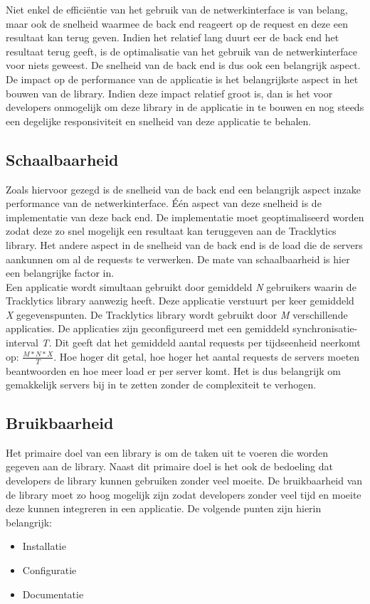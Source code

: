 \noindent Niet enkel de effici\"entie van het gebruik van de netwerkinterface is van belang, maar ook de snelheid waarmee de back end reageert op de request en deze een resultaat kan terug geven. Indien het relatief lang duurt eer de back end het resultaat terug geeft, is de optimalisatie van het gebruik van de netwerkinterface voor niets geweest. De snelheid van de back end is dus ook een belangrijk aspect. \\

\noindent De impact op de performance van de applicatie is het belangrijkste aspect in het bouwen van de library. Indien deze impact relatief groot is, dan is het voor developers onmogelijk om deze library in de applicatie in te bouwen en nog steeds een degelijke responsiviteit en snelheid van deze applicatie te behalen. 

\subsection{Schaalbaarheid}
Zoals hiervoor gezegd is de snelheid van de back end een belangrijk aspect inzake performance van de netwerkinterface. \'E\'en aspect van deze snelheid is de implementatie van deze back end. De implementatie moet geoptimaliseerd worden zodat deze zo snel mogelijk een resultaat kan teruggeven aan de Tracklytics library. Het andere aspect in de snelheid van de back end is de load die de servers aankunnen om al de requests te verwerken. De mate van schaalbaarheid is hier een belangrijke factor in. \\

\noindent Een applicatie wordt simultaan gebruikt door gemiddeld \textit{N} gebruikers waarin de Tracklytics library aanwezig heeft. Deze applicatie verstuurt per keer gemiddeld \textit{X} gegevenspunten. De Tracklytics library wordt gebruikt door \textit{M} verschillende applicaties. De applicaties zijn geconfigureerd met een gemiddeld synchronisatie-interval \textit{T}. Dit geeft dat het gemiddeld aantal requests per tijdseenheid neerkomt op: $\frac{M*N*X}{T}$. Hoe hoger dit getal, hoe hoger het aantal requests de servers moeten beantwoorden en hoe meer load er per server komt. Het is dus belangrijk om gemakkelijk servers bij in te zetten zonder de complexiteit te verhogen. \\



\subsection{Bruikbaarheid}
Het primaire doel van een library is om de taken uit te voeren die worden gegeven aan de library. Naast dit primaire doel is het ook de bedoeling dat developers de library kunnen gebruiken zonder veel moeite. De bruikbaarheid van de library moet zo hoog mogelijk zijn zodat developers zonder veel tijd en moeite deze kunnen integreren in een applicatie. De volgende punten zijn hierin belangrijk: 
\begin{itemize}
\item Installatie
\item Configuratie
\item Documentatie
\end{itemize}

